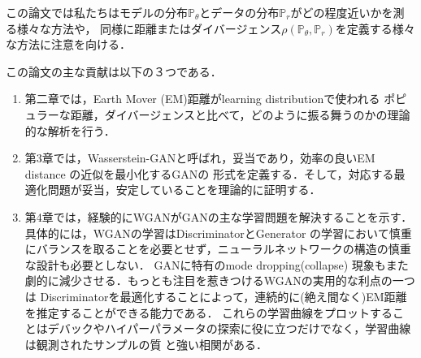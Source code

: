 \documentclass[uplatex, dvipdfmx]{jsarticle}
\theoremstyle{definition}
\begin{document}
    この論文では私たちはモデルの分布$\mathbb{P}_{\theta}$とデータの分布$\mathbb{P}_{r}$がどの程度近いかを測る様々な方法や，
    同様に距離またはダイバージェンス$\rho (\mathbb{P}_{\theta}, \mathbb{P}_{r})$を定義する様々な方法に注意を向ける．
    
    この論文の主な貢献は以下の３つである．
    \begin{enumerate}
        \item 第二章では，Earth Mover (EM)距離がlearning distributionで使われる
        ポピュラーな距離，ダイバージェンスと比べて，どのように振る舞うのかの理論的な解析を行う．
        \item 第3章では，Wasserstein-GANと呼ばれ，妥当であり，効率の良いEM distance の近似を最小化するGANの
        形式を定義する．そして，対応する最適化問題が妥当，安定していることを理論的に証明する．
        \item 第4章では，経験的にWGANがGANの主な学習問題を解決することを示す．具体的には，WGANの学習はDiscriminatorとGenerator
        の学習において慎重にバランスを取ることを必要とせず，ニューラルネットワークの構造の慎重な設計も必要としない．
        GANに特有のmode dropping(collapse) 現象もまた劇的に減少させる．もっとも注目を惹きつけるWGANの実用的な利点の一つは
        Discriminatorを最適化することによって，連続的に(絶え間なく)EM距離を推定することができる能力である．
        これらの学習曲線をプロットすることはデバックやハイパーパラメータの探索に役に立つだけでなく，学習曲線は観測されたサンプルの質
        と強い相関がある．
    \end{enumerate}
\end{document}
